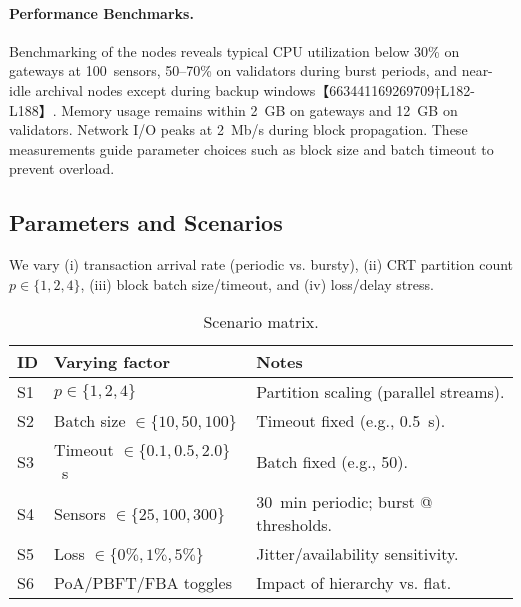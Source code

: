 \paragraph{Performance Benchmarks.}  Benchmarking of the nodes reveals typical CPU utilization below 30\% on gateways at 100~sensors, 50–70\% on validators during burst periods, and near-idle archival nodes except during backup windows【663441169269709†L182-L188】.  Memory usage remains within 2~GB on gateways and 12~GB on validators.  Network I/O peaks at 2~Mb/s during block propagation.  These measurements guide parameter choices such as block size and batch timeout to prevent overload.

\subsection{Parameters and Scenarios}
We vary (i) transaction arrival rate (periodic vs. bursty), (ii) CRT partition count $p\in\{1,2,4\}$, (iii) block batch size/timeout, and (iv) loss/delay stress.
\begin{table}[!t]
  \centering
  \caption{Scenario matrix.}
  \label{tab:scenarios}
  \begin{tabular}{lll}
    \toprule
    ID & Varying factor & Notes \\
    \midrule
    S1 & $p\in\{1,2,4\}$ & Partition scaling (parallel streams). \\
    S2 & Batch size $\in\{10,50,100\}$ & Timeout fixed (e.g., 0.5~s). \\
    S3 & Timeout $\in\{0.1,0.5,2.0\}$~s & Batch fixed (e.g., 50). \\
    S4 & Sensors $\in\{25,100,300\}$ & 30~min periodic; burst @ thresholds. \\
    S5 & Loss $\in\{0\%,1\%,5\%\}$ & Jitter/availability sensitivity. \\
    S6 & PoA/PBFT/FBA toggles & Impact of hierarchy vs. flat. \\
    \bottomrule
  \end{tabular}
\end{table}

